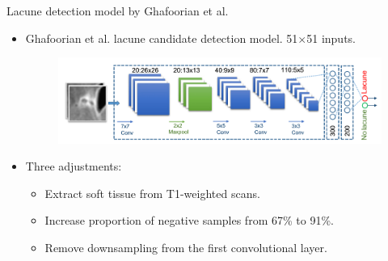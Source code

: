 \documentclass{beamer}
\begin{document}
\begin{frame}{Lacune detection model by Ghafoorian et al.}
\begin{itemize}
\item Ghafoorian et al. \cite{GhafoorianM.2017Dml3} lacune candidate detection model. 51$\times$51 inputs.
\begin{figure}
\centering
\includegraphics[width=\linewidth]{../Thesis_Docs/Images/5_ghafoorian_model1.png}
\end{figure}
\item Three adjustments:
\begin{itemize}
\item Extract soft tissue from T1-weighted scans.
\item Increase proportion of negative samples from 67\% to 91\%.
\item Remove downsampling from the first convolutional layer.
\end{itemize}
\end{itemize}
\end{frame}
\end{document}
